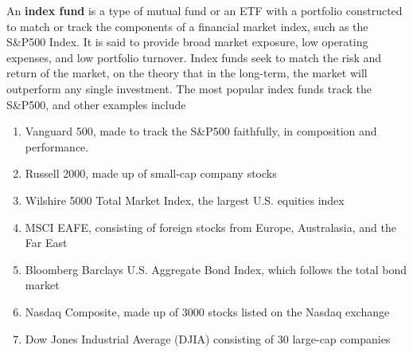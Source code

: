 \documentclass{article}
\begin{document}
      \begin{definition}
        \label{def:index-funds}
        An \textbf{index fund} is a type of mutual fund or an ETF with a portfolio constructed to match or track the components of a financial market index, such as the S\&P500 Index. It is said to provide broad market exposure, low operating expenses, and low portfolio turnover. Index funds seek to match the risk and return of the market, on the theory that in the long-term, the market will outperform any single investment. The most popular index funds track the S\&P500, and other examples include
        \begin{enumerate}
          \item Vanguard 500, made to track the S\&P500 faithfully, in composition and performance. 
          \item Russell 2000, made up of small-cap company stocks
          \item Wilshire 5000 Total Market Index, the largest U.S. equities index 
          \item MSCI EAFE, consisting of foreign stocks from Europe, Australasia, and the Far East
          \item Bloomberg Barclays U.S. Aggregate Bond Index, which follows the total bond market
          \item Nasdaq Composite, made up of 3000 stocks listed on the Nasdaq exchange
          \item Dow Jones Industrial Average (DJIA) consisting of 30 large-cap companies
        \end{enumerate}
      \end{definition}
\end{document}
